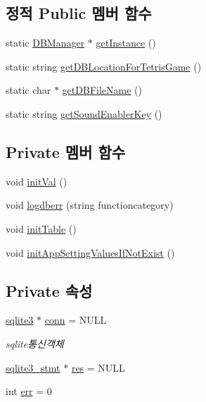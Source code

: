 \subsection*{정적 Public 멤버 함수}
\begin{DoxyCompactItemize}
\item 
static \hyperlink{class_tetris_1_1_d_b_management_1_1_d_b_manager}{D\+B\+Manager} $\ast$ \hyperlink{class_tetris_1_1_d_b_management_1_1_d_b_manager_a9cb81505055490211a9b5c79c3c22c18}{get\+Instance} ()
\item 
static string \hyperlink{class_tetris_1_1_d_b_management_1_1_d_b_manager_ae50cfd222e276a5ca27e17c886aa5dd5}{get\+D\+B\+Location\+For\+Tetris\+Game} ()
\item 
static char $\ast$ \hyperlink{class_tetris_1_1_d_b_management_1_1_d_b_manager_a5d49e7fac7d2a65973151a7fb81ea560}{get\+D\+B\+File\+Name} ()
\item 
static string \hyperlink{class_tetris_1_1_d_b_management_1_1_d_b_manager_ae8c98091466565c4c70971e6b7a42ce6}{get\+Sound\+Enabler\+Key} ()
\end{DoxyCompactItemize}
\subsection*{Private 멤버 함수}
\begin{DoxyCompactItemize}
\item 
void \hyperlink{class_tetris_1_1_d_b_management_1_1_d_b_manager_afa17031e7f2bf8c61073bc79442bacfd}{init\+Val} ()
\item 
void \hyperlink{class_tetris_1_1_d_b_management_1_1_d_b_manager_a6b723e555cef747b7402661eb960bd78}{logdberr} (string functioncategory)
\item 
void \hyperlink{class_tetris_1_1_d_b_management_1_1_d_b_manager_a07a391f97339bacd983f2598dd7a3ade}{init\+Table} ()
\item 
void \hyperlink{class_tetris_1_1_d_b_management_1_1_d_b_manager_a08f9bdc18cc015a7746e47c37eba613c}{init\+App\+Setting\+Values\+If\+Not\+Exist} ()
\end{DoxyCompactItemize}
\subsection*{Private 속성}
\begin{DoxyCompactItemize}
\item 
\hyperlink{sqlite3_8h_a0ef6f2646262c8a9b24368d8ac140f69}{sqlite3} $\ast$ \hyperlink{class_tetris_1_1_d_b_management_1_1_d_b_manager_acc2c19420c2b1b1b2c1e724b3a8ec4b7}{conn} = N\+U\+LL
\begin{DoxyCompactList}\small\item\em sqlite통신객체 \end{DoxyCompactList}\item 
\hyperlink{sqlite3_8h_af2a033da1327cdd77f0a174a09aedd0c}{sqlite3\+\_\+stmt} $\ast$ \hyperlink{class_tetris_1_1_d_b_management_1_1_d_b_manager_af161e9c2d2f9dea602bea867542deedb}{res} = N\+U\+LL
\item 
int \hyperlink{class_tetris_1_1_d_b_management_1_1_d_b_manager_a9ea8d963f1a9b8117fa5e92b54eda114}{err} = 0
\end{DoxyCompactItemize}


